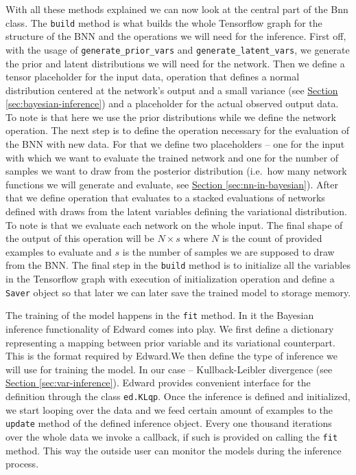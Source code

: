\documentclass[12pt,a4paper,twoside]{scrartcl}
\numberwithin{equation}{section}
\newcommand{\refsec}[1]{\hyperref[#1]{Section \ref*{#1}}}
\begin{document}
With all these methods explained we can now look at the central part of the Bnn class. The \texttt{build} method is what builds the whole Tensorflow graph for the structure of the BNN and the operations we will need for the inference. First off, with the usage of \texttt{generate\_prior\_vars} and \texttt{generate\_latent\_vars}, we generate the prior and latent distributions we will need for the network. Then we define a tensor placeholder for the input data, operation that defines a normal distribution centered at the network's output and a small variance (see \refsec{sec:bayesian-inference}) and a placeholder for the actual observed output data. To note is that here we use the prior distributions while we define the network operation. The next step is to define the operation necessary for the evaluation of the BNN with new data. For that we define two placeholders -- one for the input with which we want to evaluate the trained network and one for the number of samples we want to draw from the posterior distribution (i.e.\ how many network functions we will generate and evaluate, see \refsec{sec:nn-in-bayesian}). After that we define operation that evaluates to a stacked evaluations of networks defined with draws from the latent variables defining the variational distribution. To note is that we evaluate each network on the whole input. The final shape of the output of this operation will be \(N \times s\) where \(N\) is the count of provided examples to evaluate and \(s\) is the number of samples we are supposed to draw from the BNN. The final step in the \texttt{build} method is to initialize all the variables in the Tensorflow graph with execution of initialization operation and define a \texttt{Saver} object so that later we can later save the trained model to storage memory.

The training of the model happens in the \texttt{fit} method. In it the Bayesian inference functionality of Edward comes into play. We first define a dictionary representing a mapping between prior variable and its variational counterpart. This is the format required by Edward.We then define the type of inference we will use for training the model. In our case -- Kullback-Leibler divergence (see \refsec{sec:var-inference}). Edward provides convenient interface for the definition through the class \texttt{ed.KLqp}. Once the inference is defined and initialized, we start looping over the data and we feed certain amount of examples to the \texttt{update} method of the defined inference object. Every one thousand iterations over the whole data we invoke a callback, if such is provided on calling the \texttt{fit} method. This way the outside user can monitor the models during the inference process.
\end{document}
